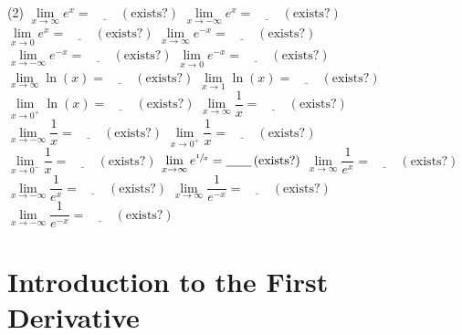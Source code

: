 \documentclass[12pt,]{book}
\theoremstyle{plain}
\theoremstyle{definition}
\numberwithin{equation}{section}
\newcommand{\fe}[2]{#1\mathopen{}\left(#2\right)\mathclose{}}
\begin{document}
\begin{exercisegroup}(2)
\exercise[24.]\hypertarget{exercise-160}{\null}\(\lim\limits_{x\to\infty}e^x=\underline{\qquad}\,(\text{exists?})\)%
\exercise[25.]\hypertarget{exercise-161}{\null}\(\lim\limits_{x\to-\infty}e^x=\underline{\qquad}\,(\text{exists?})\)%
\exercise[26.]\hypertarget{exercise-162}{\null}\(\lim\limits_{x\to0}e^x=\underline{\qquad}\,(\text{exists?})\)%
\exercise[27.]\hypertarget{exercise-163}{\null}\(\lim\limits_{x\to\infty}e^{-x}=\underline{\qquad}\,(\text{exists?})\)%
\exercise[28.]\hypertarget{exercise-164}{\null}\(\lim\limits_{x\to-\infty}e^{-x}=\underline{\qquad}\,(\text{exists?})\)%
\exercise[29.]\hypertarget{exercise-165}{\null}\(\lim\limits_{x\to0}e^{-x}=\underline{\qquad}\,(\text{exists?})\)%
\exercise[30.]\hypertarget{exercise-166}{\null}\(\lim\limits_{x\to\infty}\fe{\ln}{x}=\underline{\qquad}\,(\text{exists?})\)%
\exercise[31.]\hypertarget{exercise-167}{\null}\(\lim\limits_{x\to1}\fe{\ln}{x}=\underline{\qquad}\,(\text{exists?})\)%
\exercise[32.]\hypertarget{exercise-168}{\null}\(\lim\limits_{x\to0^{+}}\fe{\ln}{x}=\underline{\qquad}\,(\text{exists?})\)%
\exercise[33.]\hypertarget{exercise-169}{\null}\(\lim\limits_{x\to\infty}\dfrac{1}{x}=\underline{\qquad}\,(\text{exists?})\)%
\exercise[34.]\hypertarget{exercise-170}{\null}\(\lim\limits_{x\to-\infty}\dfrac{1}{x}=\underline{\qquad}\,(\text{exists?})\)%
\exercise[35.]\hypertarget{exercise-171}{\null}\(\lim\limits_{x\to0^{+}}\dfrac{1}{x}=\underline{\qquad}\,(\text{exists?})\)%
\exercise[36.]\hypertarget{exercise-172}{\null}\(\lim\limits_{x\to0^{-}}\dfrac{1}{x}=\underline{\qquad}\,(\text{exists?})\)%
\exercise[37.]\hypertarget{exercise-173}{\null}\(\lim\limits_{x\to\infty}e^{\sfrac{1}{x}}=\underline{\qquad}\,(\text{exists?})\)%
\exercise[38.]\hypertarget{exercise-174}{\null}\(\lim\limits_{x\to\infty}\dfrac{1}{e^x}=\underline{\qquad}\,(\text{exists?})\)%
\exercise[39.]\hypertarget{exercise-175}{\null}\(\lim\limits_{x\to-\infty}\dfrac{1}{e^x}=\underline{\qquad}\,(\text{exists?})\)%
\exercise[40.]\hypertarget{exercise-176}{\null}\(\lim\limits_{x\to\infty}\dfrac{1}{e^{-x}}=\underline{\qquad}\,(\text{exists?})\)%
\exercise[41.]\hypertarget{exercise-177}{\null}\(\lim\limits_{x\to-\infty}\dfrac{1}{e^{-x}}=\underline{\qquad}\,(\text{exists?})\)%
\end{exercisegroup}
\par\smallskip\noindent
\typeout{************************************************}
\typeout{************************************************}
\chapter[Introduction to the First Derivative]{Introduction to the First Derivative}\label{chapter-introduction-first-derivative}
\typeout{************************************************}
\typeout{************************************************}
\end{document}
